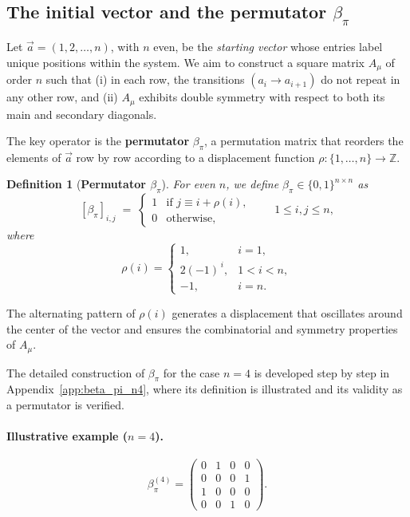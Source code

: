 \documentclass{article}
\newtheorem{definition}[theorem]{Definition}
\begin{document}
\subsection{The initial vector and the permutator \(\beta_\pi\)}\label{subsec:beta_pi}

Let \(\vec{a} = (1,2,\dots,n)\), with \(n\) even, be the \emph{starting vector} whose entries label unique positions within the system.  
We aim to construct a square matrix \(A_\mu\) of order \(n\) such that  
(i) in each row, the transitions \((a_i \to a_{i+1})\) do not repeat in any other row, and  
(ii) \(A_\mu\) exhibits double symmetry with respect to both its main and secondary diagonals.

The key operator is the \textbf{permutator} \(\beta_\pi\), a permutation matrix that reorders the elements of \(\vec{a}\) row by row according to a displacement function \(\rho \colon \{1,\dots,n\} \to \mathbb{Z}\).

\begin{definition}[\textbf{Permutator \(\beta_\pi\)}]\label{def:beta_pi}
For even \(n\), we define \(\beta_\pi \in \{0,1\}^{n \times n}\) as
\[
[\beta_\pi]_{i,j} \;=\;
\begin{cases}
1 & \text{if } j \equiv i + \rho(i),\\[2pt]
0 & \text{otherwise},
\end{cases}
\qquad 1 \le i,j \le n,
\]
where
\[
\rho(i) =
\begin{cases}
1, & i = 1,\\[2pt]
2(-1)^{\,i}, & 1 < i < n,\\[2pt]
-1, & i = n.
\end{cases}
\]
\end{definition}

The alternating pattern of \(\rho(i)\) generates a displacement that oscillates around the center of the vector and ensures the combinatorial and symmetry properties of \(A_\mu\).

\medskip

The detailed construction of \(\beta_\pi\) for the case \(n = 4\) is developed step by step in Appendix~\ref{app:beta_pi_n4}, where its definition is illustrated and its validity as a permutator is verified.

\paragraph{Illustrative example (\(n = 4\)).}
\[
\beta_\pi^{(4)} =
\begin{pmatrix}
0 & 1 & 0 & 0\\
0 & 0 & 0 & 1\\
1 & 0 & 0 & 0\\
0 & 0 & 1 & 0
\end{pmatrix}.
\]
\end{document}
